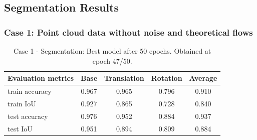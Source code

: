 \subsection{Segmentation Results}
\subsubsection{Case 1: Point cloud data without noise and theoretical flows}
\begin{table}[H]
    \begin{center}
        \begin{tabular}{|l||c|c|c|c|}
            \hline
            Evaluation metrics & Base & Translation & Rotation & Average \\
            \hline \hline
            train accuracy & 0.967 & 0.965 & 0.796 & 0.910 \\
            \hline
            train IoU & 0.927 & 0.865 & 0.728 & 0.840 \\
            \hline
            test accuracy & 0.976 & 0.952 & 0.884 & 0.937 \\
            \hline
            test IoU & 0.951 & 0.894 & 0.809 & 0.884 \\
            \hline
        \end{tabular}
    \end{center}
    \caption{Case 1 - Segmentation: Best model after 50 epochs. Obtained at epoch 47/50.}
\end{table}
